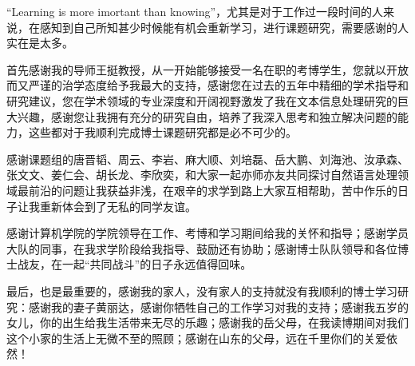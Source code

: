 

\begin{ack}
“Learning is more imortant than knowing”，尤其是对于工作过一段时间的人来说，在感知到自己所知甚少时候能有机会重新学习，进行课题研究，需要感谢的人实在是太多。

首先感谢我的导师王挺教授，从一开始能够接受一名在职的考博学生，您就以开放而又严谨的治学态度给予我最大的支持，感谢您在过去的五年中精细的学术指导和研究建议，您在学术领域的专业深度和开阔视野激发了我在文本信息处理研究的巨大兴趣，感谢您让我拥有充分的研究自由，培养了我深入思考和独立解决问题的能力，这些都对于我顺利完成博士课题研究都是必不可少的。

感谢课题组的唐晋韬、周云、李岩、麻大顺、刘培磊、岳大鹏、刘海池、汝承森、张文文、姜仁会、胡长龙、李欣奕，和大家一起亦师亦友共同探讨自然语言处理领域最前沿的问题让我获益非浅，在艰辛的求学到路上大家互相帮助，苦中作乐的日子让我重新体会到了无私的同学友谊。

感谢计算机学院的学院领导在工作、考博和学习期间给我的关怀和指导；感谢学员大队的同事，在我求学阶段给我指导、鼓励还有协助；感谢博士队队领导和各位博士战友，在一起“共同战斗”的日子永远值得回味。

最后，也是最重要的，感谢我的家人，没有家人的支持就没有我顺利的博士学习研究：感谢我的妻子黄丽达，感谢你牺牲自己的工作学习对我的支持；感谢我五岁的女儿，你的出生给我生活带来无尽的乐趣；感谢我的岳父母，在我读博期间对我们这个小家的生活上无微不至的照顾；感谢在山东的父母，远在千里你们的关爱依然！
\end{ack}
\newpage 
\mbox{} 
\newpage